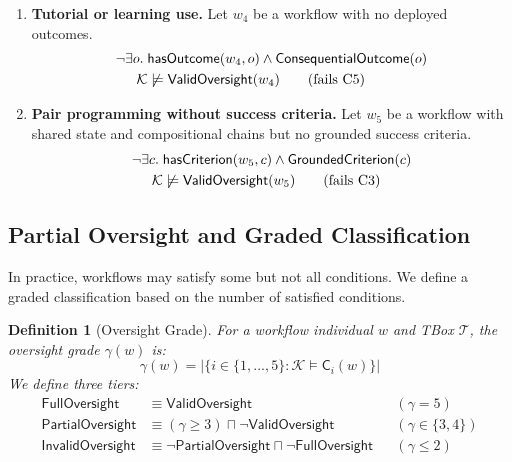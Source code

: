 \documentclass[11pt]{article}
\newtheorem{definition}{Definition}[section]
\newcommand{\TBox}{\ensuremath{\mathcal{T}}\xspace}
\newcommand{\KB}{\ensuremath{\mathcal{K}}\xspace}
\begin{document}
\begin{enumerate}[label=(\alph*),leftmargin=2em]
\item \textbf{Tutorial or learning use.}
Let $w_4$ be a workflow with no deployed outcomes.
\begin{align}
  \neg\exists o.\; &\mathsf{hasOutcome}(w_4, o) \wedge \mathsf{ConsequentialOutcome}(o) \notag \\
  \KB &\not\models \mathsf{ValidOversight}(w_4) \qquad \text{(fails C5)}
\end{align}

\item \textbf{Pair programming without success criteria.}
Let $w_5$ be a workflow with shared state and compositional chains but no grounded success criteria.
\begin{align}
  \neg\exists c.\; &\mathsf{hasCriterion}(w_5, c) \wedge \mathsf{GroundedCriterion}(c) \notag \\
  \KB &\not\models \mathsf{ValidOversight}(w_5) \qquad \text{(fails C3)}
\end{align}

\end{enumerate}

\subsection{Partial Oversight and Graded Classification}
\label{sec:partial}

In practice, workflows may satisfy some but not all conditions.
We define a graded classification based on the number of satisfied conditions.

\begin{definition}[Oversight Grade]
\label{def:grade}
For a workflow individual $w$ and TBox \TBox, the \emph{oversight grade} $\gamma(w)$ is:
\begin{equation}
  \gamma(w) = \left| \{ i \in \{1,...,5\} : \KB \models \mathsf{C}_i(w) \} \right|
\end{equation}
We define three tiers:
\begin{align}
  \mathsf{FullOversight}    &\equiv \mathsf{ValidOversight} && (\gamma = 5) \\
  \mathsf{PartialOversight} &\equiv (\gamma \geq 3) \sqcap \neg\mathsf{ValidOversight} && (\gamma \in \{3,4\}) \\
  \mathsf{InvalidOversight} &\equiv \neg\mathsf{PartialOversight} \sqcap \neg\mathsf{FullOversight} && (\gamma \leq 2)
\end{align}
\end{definition}
\end{document}
